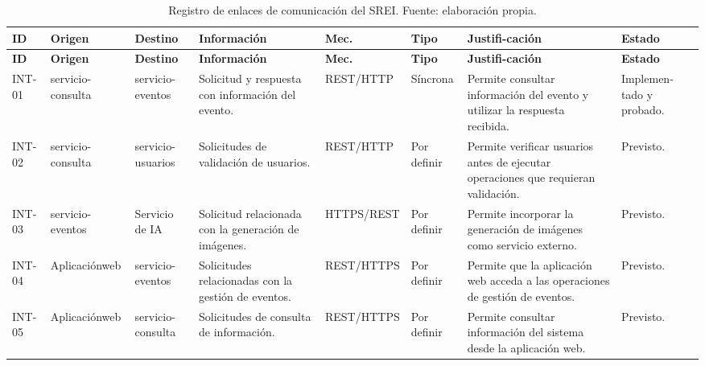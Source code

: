 \begin{longtable}{
P{0.06\textwidth}
P{0.10\textwidth}
P{0.11\textwidth}
P{0.15\textwidth}
P{0.12\textwidth}
P{0.10\textwidth}
P{0.16\textwidth}
P{0.12\textwidth}
}
\caption{Registro de enlaces de comunicación del SREI. Fuente: elaboración propia.}
\label{tab:comunicacion}\\

\toprule
\textbf{ID} &
\textbf{Origen} &
\textbf{Destino} &
\textbf{Información} &
\textbf{Mec.} &
\textbf{Tipo} &
\textbf{Justifi-\allowbreak cación} &
\textbf{Estado}\\
\midrule
\endfirsthead

\toprule
\textbf{ID} &
\textbf{Origen} &
\textbf{Destino} &
\textbf{Información} &
\textbf{Mec.} &
\textbf{Tipo} &
\textbf{Justifi-\allowbreak cación} &
\textbf{Estado}\\
\midrule
\endhead

\bottomrule
\endfoot

INT-01 &
servicio-\allowbreak consulta &
servicio-\allowbreak eventos &
Solicitud y respuesta con información del evento. &
REST/\allowbreak HTTP &
Síncrona &
Permite consultar información del evento y utilizar la respuesta recibida. &
Implemen-\allowbreak tado y probado.\\

INT-02 &
servicio-\allowbreak consulta &
servicio-\allowbreak usuarios &
Solicitudes de validación de usuarios. &
REST/\allowbreak HTTP &
Por definir &
Permite verificar usuarios antes de ejecutar operaciones que requieran validación. &
Previsto.\\

INT-03 &
servicio-\allowbreak eventos &
Servicio de IA &
Solicitud relacionada con la generación de imágenes. &
HTTPS/\allowbreak REST &
Por definir &
Permite incorporar la generación de imágenes como servicio externo. &
Previsto.\\

INT-04 &
Aplica\-ción\newline web &
servicio-\allowbreak eventos &
Solicitudes relacionadas con la gestión de eventos. &
REST/\allowbreak HTTPS &
Por definir &
Permite que la aplicación web acceda a las operaciones de gestión de eventos. &
Previsto.\\

INT-05 &
Aplica\-ción\newline web &
servicio-\allowbreak consulta &
Solicitudes de consulta de información. &
REST/\allowbreak HTTPS &
Por definir &
Permite consultar información del sistema desde la aplicación web. &
Previsto.\\


\end{longtable}
